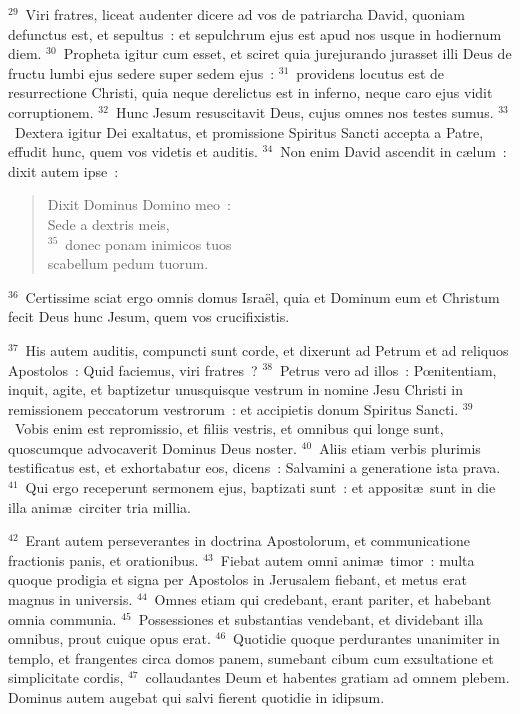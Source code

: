 ${}^{29}$~Viri fratres, liceat audenter dicere ad vos de patriarcha David, quoniam defunctus est, et sepultus~: et sepulchrum ejus est apud nos usque in hodiernum diem.
${}^{30}$~Propheta igitur cum esset, et sciret quia jurejurando jurasset illi Deus de fructu lumbi ejus sedere super sedem ejus~:
${}^{31}$~providens locutus est de resurrectione Christi, quia neque derelictus est in inferno, neque caro ejus vidit corruptionem.
${}^{32}$~Hunc Jesum resuscitavit Deus, cujus omnes nos testes sumus.
${}^{33}$~Dextera igitur Dei exaltatus, et promissione Spiritus Sancti accepta a Patre, effudit hunc, quem vos videtis et auditis.
${}^{34}$~Non enim David ascendit in c\ae lum~: dixit autem ipse~: \begin{flushleft}\begin{verse}Dixit Dominus Domino meo~:\\ Sede a dextris meis,\\
${}^{35}$~donec ponam inimicos tuos\\ scabellum pedum tuorum.\end{verse}\end{flushleft}


${}^{36}$~Certissime sciat ergo omnis domus Isra\"el, quia et Dominum eum et Christum fecit Deus hunc Jesum, quem vos crucifixistis.


${}^{37}$~His autem auditis, compuncti sunt corde, et dixerunt ad Petrum et ad reliquos Apostolos~: Quid faciemus, viri fratres~?
${}^{38}$~Petrus vero ad illos~: Pœnitentiam, inquit, agite, et baptizetur unusquisque vestrum in nomine Jesu Christi in remissionem peccatorum vestrorum~: et accipietis donum Spiritus Sancti.
${}^{39}$~Vobis enim est repromissio, et filiis vestris, et omnibus qui longe sunt, quoscumque advocaverit Dominus Deus noster.
${}^{40}$~Aliis etiam verbis plurimis testificatus est, et exhortabatur eos, dicens~: Salvamini a generatione ista prava.
${}^{41}$~Qui ergo receperunt sermonem ejus, baptizati sunt~: et apposit\ae\ sunt in die illa anim\ae\ circiter tria millia.


${}^{42}$~Erant autem perseverantes in doctrina Apostolorum, et communicatione fractionis panis, et orationibus.
${}^{43}$~Fiebat autem omni anim\ae\ timor~: multa quoque prodigia et signa per Apostolos in Jerusalem fiebant, et metus erat magnus in universis.
${}^{44}$~Omnes etiam qui credebant, erant pariter, et habebant omnia communia.
${}^{45}$~Possessiones et substantias vendebant, et dividebant illa omnibus, prout cuique opus erat.
${}^{46}$~Quotidie quoque perdurantes unanimiter in templo, et frangentes circa domos panem, sumebant cibum cum exsultatione et simplicitate cordis,
${}^{47}$~collaudantes Deum et habentes gratiam ad omnem plebem. Dominus autem augebat qui salvi fierent quotidie in idipsum.

